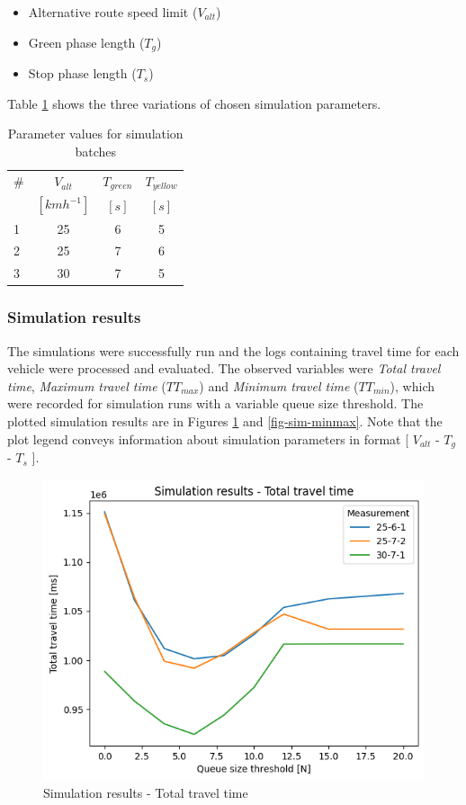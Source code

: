 \documentclass[0main.tex]{subfiles}
\begin{document}
\begin{itemize}
    \item Alternative route speed limit ($V_{alt}$)
    \item Green phase length ($T_{g}$)
    \item Stop phase length ($T_{s}$)
\end{itemize}

Table \ref{tab-sims} shows the three variations of chosen simulation parameters.

\begin{table}[htbp]
    \caption{Parameter values for simulation batches}
    \centering\begin{tabular}{lccc}
        \toprule
        \# & $V_{alt}$ & $T_{green}$ & $T_{yellow}$ \\ 
         & $[kmh^{-1}]$ & $[s]$ & $[s]$ \\ \midrule
        1 & 25  & 6 & 5 \\
        2 & 25  & 7 & 6 \\
        3 & 30  & 7 & 5 \\ \bottomrule
    \end{tabular}
    \label{tab-sims}
\end{table}

\subsubsection{Simulation results}

The simulations were successfully run and the logs containing travel time for each vehicle were
processed and evaluated. The observed variables were \emph{Total travel time}, \emph{Maximum
travel time} ($TT_{max}$) and \emph{Minimum travel time} ($TT_{min}$), which were recorded for
simulation runs with a variable queue size threshold. The plotted simulation results are in
Figures \ref{fig-sim-ttt} and \ref{fig-sim-minmax}. Note that the plot legend conveys
information about simulation parameters in format [ $V_{alt}$ - $T_{g}$ - $T_{s}$ ].

\begin{figure}[htbp]
    \centering
    \includegraphics[width=.8\textwidth]{ttt.png}
    \caption{Simulation results - Total travel time}
    \label{fig-sim-ttt}
\end{figure}
\end{document}
